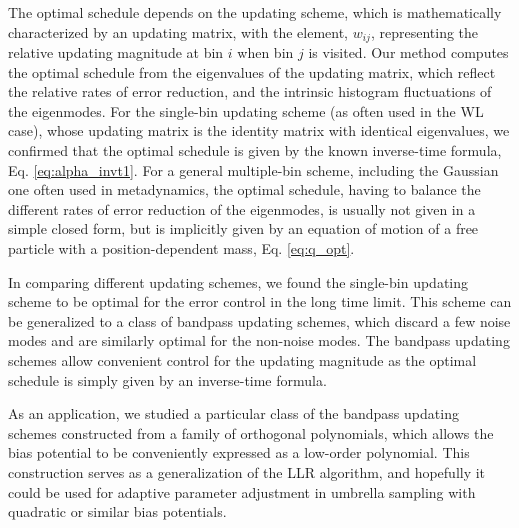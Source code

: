 \documentclass[reprint, superscriptaddress, floatfix]{revtex4-1}
\begin{document}
The optimal schedule depends on the updating scheme,
which is mathematically characterized by an updating matrix,
with the element, $w_{ij}$,
representing the relative updating magnitude
at bin $i$ when bin $j$ is visited.
%
Our method computes the optimal schedule from
the eigenvalues of the updating matrix,
which reflect the relative rates of error reduction,
and the intrinsic histogram fluctuations
of the eigenmodes.
%
For the single-bin updating scheme (as often used in the WL case),
whose updating matrix is the identity matrix with identical eigenvalues,
we confirmed that the optimal schedule
is given by the known inverse-time formula,
Eq. \eqref{eq:alpha_invt1}.
%
For a general multiple-bin scheme,
including the Gaussian one often used in metadynamics,
the optimal schedule, having to balance
the different rates of error reduction of the eigenmodes,
is usually not given in a simple closed form,
but is implicitly given by an equation of motion
of a free particle with a position-dependent mass,
Eq. \eqref{eq:q_opt}.
%



In comparing different updating schemes,
we found
the single-bin updating scheme to be optimal
for the error control in the long time limit.
%
This scheme can be generalized to
a class of bandpass updating schemes,
which discard a few noise modes
and are similarly optimal for the non-noise modes.
%
The bandpass updating schemes allow convenient control
for the updating magnitude
as the optimal schedule
is simply given by an inverse-time formula.

As an application,
we studied a particular class
of the bandpass updating schemes
constructed from a family of orthogonal polynomials,
which allows the bias potential
to be conveniently expressed as a low-order polynomial.
%
This construction serves as a generalization
of the LLR algorithm\cite{langfeld2012, pellegrini2014},
and hopefully it could be used for
adaptive parameter adjustment
in umbrella sampling with
quadratic\cite{neuhaus2006, *neuhaus2007, zhu2012}
or similar\cite{martin-mayor2007, *sergio2011, *persson2013, kim2010}
bias potentials.
\end{document}
